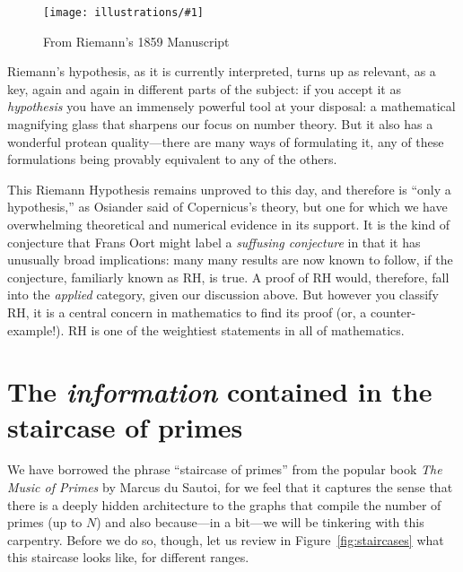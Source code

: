 \documentclass[11pt]{article}
\newcommand{\ill}[3]{ 
   \begin{figure}[H]
   \begin{center}
   \texttt{[image: illustrations/\#1]}
   \caption{#3}
   \end{center}
    \end{figure}
}
\theoremstyle{plain}
\theoremstyle{definition}
\numberwithin{equation}{section}
\numberwithin{figure}{section}
\numberwithin{table}{section}
\begin{document}
\ill{riemann_zoom}{1}{From Riemann's 1859 Manuscript\label{fig:riemamn}}

Riemann's hypothesis, as it is currently interpreted, turns up as
relevant, as a key, again and again in different parts of the subject:
if you accept it as {\em hypothesis} you have an immensely powerful
tool at your disposal: a mathematical magnifying glass that sharpens
our focus on number theory. But it also has a wonderful protean
quality---there are many ways of formulating it, any of these
formulations being provably equivalent to any of the others.

This Riemann Hypothesis remains unproved to this day, and therefore is
``only a hypothesis,'' as Osiander said of Copernicus's theory, but one
for which we have overwhelming theoretical and numerical evidence in
its support.  It is the kind of conjecture that Frans Oort might label
a {\em suffusing conjecture} in that it has unusually broad
implications: many many results are now known to follow, if the
conjecture, familiarly known as RH, is true. A proof of RH would,
therefore, fall into the {\em applied} category, given our discussion
above.  But however you classify RH, it is a central concern in
mathematics to find its proof (or, a counter-example!).  RH is 
one of the weightiest statements in all of mathematics. 


\section{The {\em information} contained in the staircase of primes}
 
\bigskip

We have borrowed the phrase ``staircase of primes'' from the popular
book {\em The Music of Primes} by Marcus du Sautoi, for we feel that
it captures the sense that there is a deeply hidden architecture to
the graphs that compile the number of primes (up to $N$) and also
because---in a bit---we will be tinkering with this carpentry.  Before
we do so, though, let us review in Figure~\ref{fig:staircases}
what this staircase looks like, for
different ranges.
\end{document}
